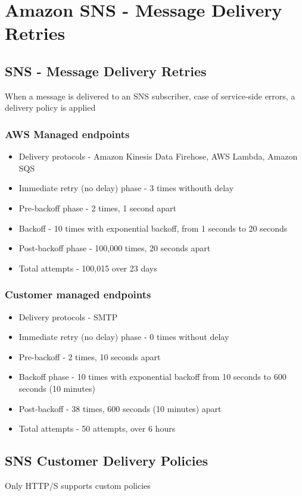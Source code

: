 \section{Amazon SNS - Message Delivery Retries}

\subsection{SNS - Message Delivery Retries}
When a message is delivered to an SNS subscriber, case of service-side errors, a delivery policy is applied

\subsubsection{AWS Managed endpoints}
\begin{itemize}
    \item Delivery protocols - Amazon Kinesis Data Firehose, AWS Lambda, Amazon SQS
    \item Immediate retry (no delay) phase - 3 times withouth delay
    \item Pre-backoff phase - 2 times, 1 second apart
    \item Backoff - 10 times with exponential backoff, from 1 seconds to 20 seconds
    \item Post-backoff phase - 100,000 times, 20 seconds apart
    \item Total attempts - 100,015 over 23 days
\end{itemize}

\subsubsection{Customer managed endpoints}
\begin{itemize}
    \item Delivery protocols - SMTP
    \item Immediate retry (no delay) phase - 0 times without delay
    \item Pre-backoff - 2 times, 10 seconds apart
    \item Backoff phase - 10 times with exponential backoff from 10 seconds to 600 seconds (10 minutes)
    \item Post-backoff - 38 times, 600 seconds (10 minutes) apart
    \item Total attempts - 50 attempts, over 6 hours
\end{itemize}

\subsection{SNS Customer Delivery Policies}
Only HTTP/S supports custom policies

